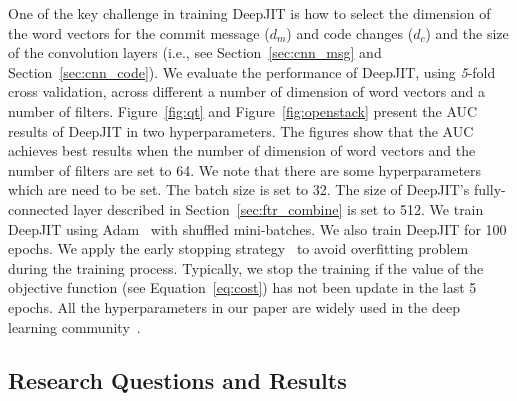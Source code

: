 One of the key challenge in training DeepJIT is how to select the dimension of the word vectors for the commit message ($d_m$) and code changes ($d_c$) and the size of the convolution layers (i.e., see Section~\ref{sec:cnn_msg} and Section~\ref{sec:cnn_code}). We evaluate the performance of DeepJIT, using \textit{5}-fold cross validation, across different a number of dimension of word vectors and a number of filters. Figure~\ref{fig:qt} and Figure~\ref{fig:openstack} present the AUC results of DeepJIT in two hyperparameters. The figures show that the AUC achieves best results when the number of dimension of word vectors and the number of filters are set to 64. We note that there are some hyperparameters which are need to be set. The batch size is set to 32. The size of DeepJIT's fully-connected layer described in Section~\ref{sec:ftr_combine} is set to 512. We train DeepJIT using Adam~\cite{kingma2014adam} with shuffled mini-batches. We also train DeepJIT for 100 epochs. We apply the early stopping strategy~\cite{prechelt1998automatic, caruana2001overfitting} to avoid overfitting problem during the training process. Typically, we stop the training if the value of the objective function (see Equation~\ref{eq:cost}) has not been update in the last 5 epochs. All the hyperparameters in our paper are widely used in the deep learning community~\cite{severyn2015learning, huo2016learning, huo2017enhancing, hinton2012improving}.

 
 

\subsection{Research Questions and Results}
\label{sec:rq_results}

